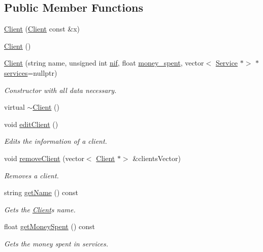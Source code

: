 \subsection*{Public Member Functions}
\begin{DoxyCompactItemize}
\item 
\hyperlink{class_client_ab3079953a67493b5da6ffb32d4f14ac7}{Client} (\hyperlink{class_client}{Client} const \&x)
\item 
\hyperlink{class_client_ae51af7aa6b8f591496a8f6a4a87a14bf}{Client} ()
\item 
\hyperlink{class_client_acb0d694a9c7e32a47bd57ead6013b8a9}{Client} (string name, unsigned int \hyperlink{class_client_a1c94dc96a56cb5032573fb1d528517c2}{nif}, float \hyperlink{class_client_a9d5dc70a6eee2fded8217a7983fe5fd0}{money\+\_\+spent}, vector$<$ \hyperlink{class_service}{Service} $\ast$$>$ $\ast$\hyperlink{class_client_a02b601f12b9905edae7e64ded9bde912}{services}=nullptr)
\begin{DoxyCompactList}\small\item\em Constructor with all data necessary. \end{DoxyCompactList}\item 
virtual \hyperlink{class_client_a840e519ca781888cbd54181572ebe3a7}{$\sim$\+Client} ()
\item 
void \hyperlink{class_client_afe8b004559fd1480fb8747c352f167db}{edit\+Client} ()
\begin{DoxyCompactList}\small\item\em Edits the information of a client. \end{DoxyCompactList}\item 
void \hyperlink{class_client_a7f845c33f4aa7b7081ae72d9a16c2d3f}{remove\+Client} (vector$<$ \hyperlink{class_client}{Client} $\ast$$>$ \&clients\+Vector)
\begin{DoxyCompactList}\small\item\em Removes a client. \end{DoxyCompactList}\item 
string \hyperlink{class_client_a5c473ba52d7678744edec9e51052c947}{get\+Name} () const
\begin{DoxyCompactList}\small\item\em Gets the \hyperlink{class_client}{Client}\textquotesingle{}s name. \end{DoxyCompactList}\item 
float \hyperlink{class_client_a226ff919591e7fdfa6c386e9aa5300a5}{get\+Money\+Spent} () const
\begin{DoxyCompactList}\small\item\em Gets the money spent in services. \end{DoxyCompactList}\item 

\end{DoxyCompactItemize}

